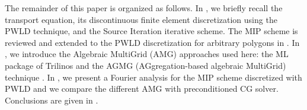 The remainder of this paper is organized as follows. In ,
we briefly recall the \sn transport equation, its discontinuous finite element
discretization using the PWLD technique, and the Source Iteration iterative scheme. 
The MIP scheme is reviewed and extended to the PWLD discretization for arbitrary 
polygons in . In , we introduce the Algebraic MultiGrid (AMG) 
approaches used here: the ML package of Trilinos \cite{ml_guide} and the
AGMG (AGgregation-based algebraic MultiGrid) technique
\cite{agmg_guide,agmg,agmg2,agmg3}. In
, we present a Fourier analysis for the MIP scheme discretized with
PWLD and we compare the different AMG with preconditioned CG solver.
Conclusions are given in .
